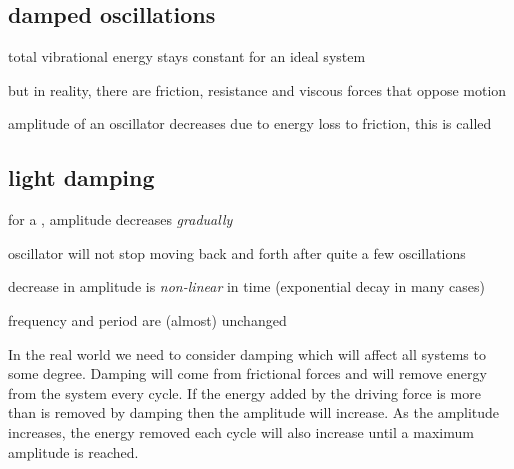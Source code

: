 \subsection{damped oscillations}

total vibrational energy stays constant for an ideal system

but in reality, there are friction, resistance and viscous forces that oppose motion

\begin{ilight}
	amplitude of an oscillator decreases due to energy loss to friction, this is called 
\end{ilight} 

\subsection{light damping}

for a , amplitude decreases \emph{gradually}

oscillator will not stop moving back and forth after quite a few oscillations

\begin{figure}[ht]
\centering
{}

\end{figure}

\cmt decrease in amplitude is \emph{non-linear} in time (exponential decay in many cases)

\cmt frequency and period are (almost) unchanged

	In the real world we need to consider damping which will affect all systems to some degree. Damping will come from frictional forces and will remove energy from the system every cycle. If the energy added by the driving force is more than is removed by damping then the amplitude will increase. As the amplitude increases, the energy removed each cycle will also increase until a maximum amplitude is reached.
	
